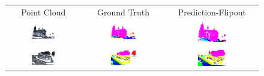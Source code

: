     \begin{figure}[h!]
        \begin{tabular}{ccc}
            Point Cloud & Ground Truth & Prediction-Flipout \\
            \includegraphics[width=0.33\textwidth, height=0.18\textheight]{images/seg_output/sem3d_seg_output/1_RGB.pdf} &
            \includegraphics[width=0.33\textwidth, height=0.18\textheight]{images/seg_output/sem3d_seg_output/1_GT.pdf}& 
            \includegraphics[width=0.33\textwidth, height=0.18\textheight]{images/seg_output/flipout/sem3d_1.pdf}\\

            \includegraphics[width=0.33\textwidth, height=0.18\textheight]{images/seg_output/sem3d_seg_output/2_RGB.pdf} &
            \includegraphics[width=0.33\textwidth, height=0.18\textheight]{images/seg_output/sem3d_seg_output/2_GT.pdf}& 
            \includegraphics[width=0.33\textwidth, height=0.18\textheight]{images/seg_output/flipout/sem3d_2.pdf}\\


\end{tabular}
\end{figure}
